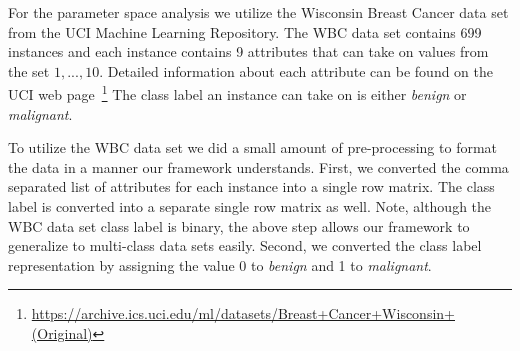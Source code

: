For the parameter space analysis we utilize the Wisconsin Breast Cancer data set from the UCI Machine Learning Repository.
The WBC data set contains 699 instances and each instance contains 9 attributes that can take on values from the set \({1,...,10}\).
Detailed information about each attribute can be found on the UCI web page~\footnote{\url{https://archive.ics.uci.edu/ml/datasets/Breast+Cancer+Wisconsin+(Original)}}
The class label an instance can take on is either {\em benign} or {\em malignant}.

To utilize the WBC data set we did a small amount of pre-processing to format the data in a manner our framework understands.
First, we converted the comma separated list of attributes for each instance into a single row matrix.
The class label is converted into a separate single row matrix as well.
Note, although the WBC data set class label is binary, the above step allows our framework to generalize to multi-class data sets easily.
Second, we converted the class label representation by assigning the value 0 to {\em benign} and 1 to {\em malignant}.
